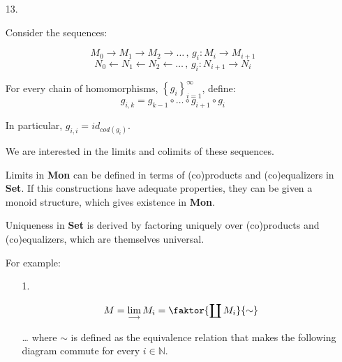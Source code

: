 \documentclass[a4paper,notitlepage]{article}
\begin{document}
\begin{enumerate}
\begin{proof}
\begin{itemize}
\begin{itemize}
          
          $$ U_{f \circ g \circ h} \cong \vert f \circ g \vert^\star (U_h)$$

          $$ U_{f \circ g \circ h} \cong \vert f \vert^\star U_{g\circ h} $$

        \end{itemize}
        
   \end{itemize}

   \end{proof}

   \item[13.]

     Consider the sequences:

     $$ M_0 → M_1 → M_2 → … \, , \, g_i : M_i → M_{i+1} $$
     $$ N_0 ← N_1 ← N_2 ← … \, , \, g_i : N_{i+1} → N_{i} $$
     
     
     For every chain of homomorphisms,  $\left\{g_i\right\}_{i=1}^\infty$, define:
     $$g_{i,k} = g_{k-1} \circ … \circ g_{i+1} \circ g_i$$

     In particular, $g_{i,i} = id_{cod(g_i)}$.


     We are interested in the limits and colimits of these sequences.

     Limits in {\bf Mon} can be defined in terms of (co)products and (co)equalizers
     in {\bf Set}. If this constructions have adequate properties, they
     can be given a monoid structure, which gives existence in {\bf Mon}.

     Uniqueness in {\bf Set} is derived by factoring uniquely
     over (co)products and (co)equalizers, which are themselves universal.

     For example:

     \begin{enumerate}
       \item[1.]
         
         $$M = \lim_{\longrightarrow} M_i = \faktor{\coprod M_i}{\sim}$$

         … where $\sim$ is defined as the equivalence relation that makes
         the following diagram commute for every $i \in \mathbb{N}$. 



\end{enumerate}
\end{enumerate}
\end{document}
